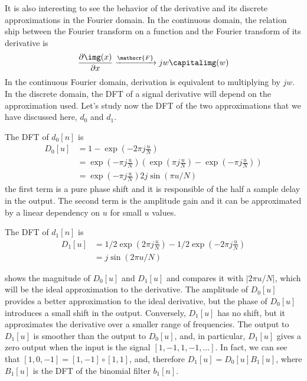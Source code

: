 It is also interesting to see the behavior of the derivative and its discrete approximations in the Fourier domain. In the continuous domain, the relation ship between the Fourier transform on a function and the Fourier transform of its derivative is
\begin{equation}
	\frac{\partial \img (x)}{\partial x}
	\xrightarrow{\mathscr{F}}
	j w \capitalimg (w)
\end{equation}
In the continuous Fourier domain, derivation is equivalent to multiplying by $jw$. In the discrete domain, the DFT of a signal derivative will depend on the approximation used. Let's study now the DFT of the two approximations that we have discussed here, $d_0$ and $d_1$.

The DFT of $d_0 \left[n\right]$ is
\begin{equation}
	\begin{split}
		D_0 \left[u \right] & = 1 - \exp \left( -2 \pi j \frac{u}{N} \right)                                                                                            \\
		                    & = \exp \left( - \pi j \frac{u}{N} \right) \left(  \exp \left( \pi j \frac{u}{N} \right) - \exp \left( -\pi j \frac{u}{N} \right)  \right) \\
		                    & = \exp \left( - \pi j \frac{u}{N} \right) 2 j \sin (\pi u /N)
	\end{split}
\end{equation}
the first term is a pure phase shift and it is responsible of the half a sample delay in the output. The second term is the amplitude gain and it can be approximated by a linear dependency on $u$ for small $u$ values.

The DFT of $d_1 \left[n\right]$ is
\begin{equation}
	\begin{split}
		D_1 \left[u \right] & =  1/2\exp \left( 2 \pi j \frac{u}{N} \right) - 1/2 \exp \left( -2 \pi j \frac{u}{N} \right) \\
		                    & =  j \sin (2 \pi u /N)
	\end{split}
\end{equation}

\Fig{\ref{fig:d0andd1_dft}} shows the magnitude of $D_0\left[u \right]$ and $D_1\left[u \right]$ and compares it with $\left| 2 \pi u/N \right|$, which will be the ideal approximation to the derivative. The amplitude of $D_0\left[u \right]$ provides a better approximation to the ideal derivative, but the phase of $D_0\left[u \right]$ introduces a small shift in the output. Conversely, $D_1\left[u \right]$ has no shift, but it approximates the derivative over a smaller range of frequencies. The output to $D_1\left[u \right]$ is smoother than the output to $D_0\left[u \right]$, and, in particular, $D_1\left[u \right]$ gives a zero output when the input is the signal $\left[ 1, -1, 1, -1, ... \right]$. In fact, we can see that $\left[1,0,-1\right] = \left[1,-1\right] \circ \left[1,1\right]$, and, therefore $D_1\left[u \right] = D_0\left[u \right] B_1\left[u \right]$, where $B_1\left[u \right]$ is the DFT of the binomial filter $b_1 \left[n \right]$.

